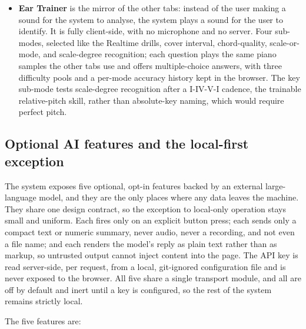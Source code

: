 \documentclass[12pt,a4paper]{article}
\begin{document}
\begin{itemize}
    \item \textbf{Ear Trainer} is the mirror of the other tabs: instead of the
    user making a sound for the system to analyse, the system plays a sound for
    the user to identify. It is fully client-side, with no microphone and no
    server. Four sub-modes, selected like the Realtime drills, cover interval,
    chord-quality, scale-or-mode, and scale-degree recognition; each question
    plays the same piano samples the other tabs use and offers multiple-choice
    answers, with three difficulty pools and a per-mode accuracy history kept in
    the browser. The key sub-mode tests scale-degree recognition after a
    I-IV-V-I cadence, the trainable relative-pitch skill, rather than
    absolute-key naming, which would require perfect pitch.
\end{itemize}

\subsection{Optional AI features and the local-first exception}
\label{sec:coaching}

The system exposes five optional, opt-in features backed by an external
large-language model, and they are the only places where any data leaves the
machine. They share one design contract, so the exception to local-only
operation stays small and uniform. Each fires only on an explicit button press;
each sends only a compact text or numeric summary, never audio, never a recording,
and not even a file name; and each renders the model's reply as plain text rather
than as markup, so untrusted output cannot inject content into the page. The API
key is read server-side, per request, from a local, git-ignored configuration
file and is never exposed to the browser. All five share a single transport
module, and all are off by default and inert until a key is configured, so the
rest of the system remains strictly local.

The five features are:
\end{document}
